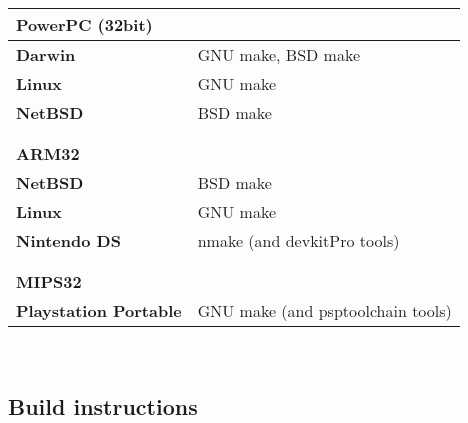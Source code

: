 \begin{tabular}{l l}
{\bf{\large PowerPC (32bit)}} &                                                      \\
\hline\hline
{\bf Darwin}                  & GNU make, BSD make                                   \\
{\bf Linux}                   & GNU make                                             \\
{\bf NetBSD}                  & BSD make                                             \\
\hline
                              &                                                      \\
                              &                                                      \\


{\bf{\large ARM32}}           &                                                      \\
\hline\hline
{\bf NetBSD}                  & BSD make                                             \\
{\bf Linux}                   & GNU make                                             \\
{\bf Nintendo DS}             & nmake (and devkitPro\cite{devkitPro} tools)          \\
\hline
                              &                                                      \\
                              &                                                      \\

{\bf{\large MIPS32}}          &                                                      \\
\hline\hline
{\bf Playstation Portable}    & GNU make (and psptoolchain\cite{psptoolchain} tools) \\
\hline

\end{tabular}\\

\pagebreak

\subsection{Build instructions}


